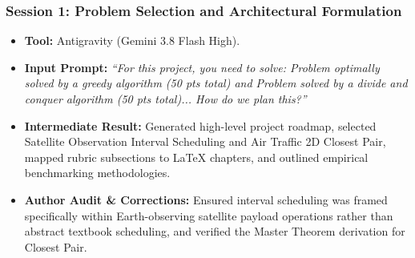 \subsubsection{Session 1: Problem Selection and Architectural Formulation}
\begin{itemize}
    \item \textbf{Tool:} Antigravity (Gemini 3.8 Flash High).
    \item \textbf{Input Prompt:} \textit{``For this project, you need to solve: Problem optimally solved by a greedy algorithm (50 pts total) and Problem solved by a divide and conquer algorithm (50 pts total)... How do we plan this?''}
    \item \textbf{Intermediate Result:} Generated high-level project roadmap, selected Satellite Observation Interval Scheduling and Air Traffic 2D Closest Pair, mapped rubric subsections to LaTeX chapters, and outlined empirical benchmarking methodologies.
    \item \textbf{Author Audit \& Corrections:} Ensured interval scheduling was framed specifically within Earth-observing satellite payload operations rather than abstract textbook scheduling, and verified the Master Theorem derivation for Closest Pair.
\end{itemize}

